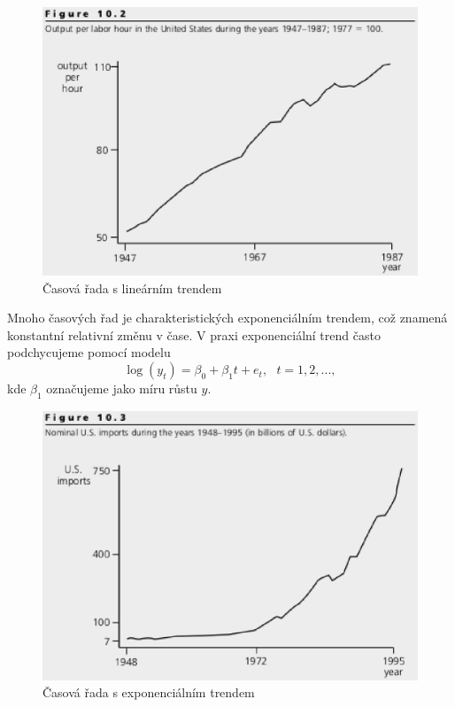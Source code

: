 \begin{figure}[htp]
\centering
\includegraphics[scale = 0.5]{pictures/figure_10_2.eps}
\caption{Časová řada s lineárním trendem}
\label{figure_10_2}
\end{figure}

Mnoho časových řad je charakteristických exponenciálním trendem, 
což znamená konstantní relativní změnu v čase. V praxi 
exponenciální trend často podchycujeme pomocí modelu
\begin{equation}
\log(y_t) = \beta_0 + \beta_1 t + e_t, ~~~ t = 1, 2, ...,
\end{equation}
kde $\beta_1$ označujeme jako míru růstu $y$.

\begin{figure}[htp]
\centering
\includegraphics[scale = 0.5]{pictures/figure_10_3.eps}
\caption{Časová řada s exponenciálním trendem}
\label{figure_10_3}
\end{figure}

